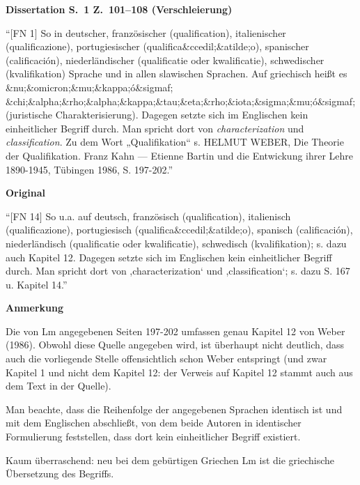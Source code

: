 \documentclass[ngerman,final,fontsize=12pt,paper=a4,twoside,bibliography=totocnumbered,BCOR=8mm,draft=false]{scrartcl}
\newenvironment{fragment}
	{\begin{snugshade}}
	{\end{snugshade}
	 \penalty-200
	 \vskip 0pt plus 10mm minus 5mm}
\newenvironment{fragmentpart}[1]
	{\noindent\textbf{#1}\par\penalty500}
	{\par}
\begin{document}
\hypertarget{Lm-Fragment-001-101}{}
\begin{fragment}
\begin{fragmentpart}{Dissertation S.~1 Z.~101--108 (Verschleierung)}
\enquote{$[$FN 1$]$ So in deutscher, französischer (qualification), italienischer (qualificazione), portugiesischer (qualifica\&ccedil;\&atilde;o), spanischer (calificación), niederländischer (qualificatie oder kwalificatie), schwedischer (kvalifikation) Sprache und in allen slawischen Sprachen. Auf griechisch heißt es \&nu;\&omicron;\&mu;\&kappa;ó\&sigmaf; \&chi;\&alpha;\&rho;\&alpha;\&kappa;\&tau;\&eta;\&rho;\&iota;\&sigma;\&mu;ó\&sigmaf; (juristische Charakterisierung). Dagegen setzte sich im Englischen kein einheitlicher Begriff durch. Man spricht dort von \textsl{characterization} und
\textsl{classification}. Zu dem Wort „Qualifikation“ s. HELMUT WEBER, Die Theorie der Qualifikation. Franz Kahn --- Etienne Bartin und die Entwickung ihrer Lehre 1890-1945, Tübingen 1986, S. 197-202.}
\end{fragmentpart}
\begin{fragmentpart}{Original \cite[S.~4 Z.~117--121]{Weber-1986}}
\enquote{$[$FN 14$]$ So u.a. auf deutsch, französisch (qualification), italienisch (qualificazione), portugiesisch (qualifica\&ccedil;\&atilde;o), spanisch (calificación), niederländisch (qualificatie oder kwalificatie), schwedisch (kvalifikation); s. dazu auch Kapitel 12. Dagegen setzte sich im Englischen kein einheitlicher Begriff durch. Man spricht dort von ,characterization‘ und ,classification‘; s. dazu S. 167 u. Kapitel 14.}
\end{fragmentpart}
\begin{fragmentpart}{Anmerkung}
Die von Lm angegebenen Seiten 197-202 umfassen genau Kapitel 12 von Weber (1986). Obwohl diese Quelle angegeben wird, ist überhaupt nicht deutlich, dass auch die vorliegende Stelle offensichtlich schon Weber entspringt (und zwar Kapitel 1 und nicht dem Kapitel 12: der Verweis auf Kapitel 12 stammt auch aus dem Text in der Quelle).

Man beachte, dass die Reihenfolge der angegebenen Sprachen identisch ist und mit dem Englischen abschließt, von dem beide Autoren in identischer Formulierung feststellen, dass dort kein \textquotedbl{}einheitlicher Begriff\textquotedbl{} existiert. 

Kaum überraschend: neu bei dem gebürtigen Griechen Lm ist die griechische Übersetzung des Begriffs.
\end{fragmentpart}
\end{fragment}
\end{document}
